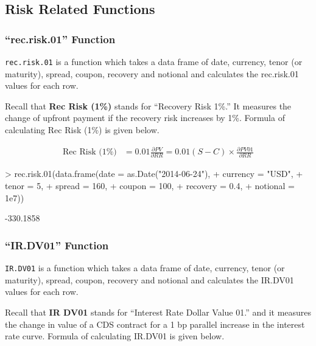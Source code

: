 \documentclass{jss}
\begin{document}
\subsection{Risk Related Functions}
\label{sec:riskFunctions}

\subsubsection{``rec.risk.01'' Function}

\texttt{rec.risk.01} is a function which takes a data frame of date, currency, tenor (or maturity), spread, coupon, recovery and notional and calculates the rec.risk.01 values for each row. 

Recall that \textbf{Rec Risk (1\%)} stands for ``Recovery Risk 1\%.'' It measures the change of upfront payment if the recovery risk increases by 1\%. Formula of calculating Rec Risk (1\%) is given below.

\begin{align*}
  \text{Rec Risk (1\%)} &= 0.01 \frac{\partial PV}{\partial RR} = 0.01 (S - C) \times \frac{\partial PV01}{\partial RR}
\end{align*}

\begin{Schunk}
\begin{Sinput}
> rec.risk.01(data.frame(date     = as.Date("2014-06-24"),
+                        currency = "USD",
+                        tenor    = 5,
+                        spread   = 160,
+                        coupon   = 100,
+                        recovery = 0.4,
+                        notional = 1e7))
\end{Sinput}
\begin{Soutput}
[1] -330.1858
\end{Soutput}
\end{Schunk}

\subsubsection{``IR.DV01'' Function}

\texttt{IR.DV01} is a function which takes a data frame of date, currency, tenor (or maturity), spread, coupon, recovery and notional and calculates the IR.DV01 values for each row.

Recall that \textbf{IR DV01} stands for ``Interest Rate Dollar Value 01.'' and it measures the change in value of a CDS contract for a 1 bp parallel increase in the interest rate curve. Formula of calculating IR.DV01 is given below.
\end{document}
